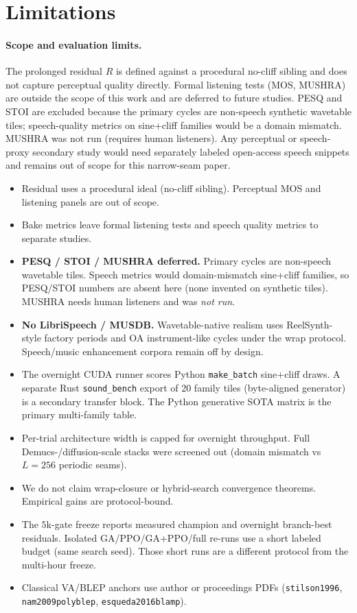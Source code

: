 \section{Limitations}
\label{sec:limitations}

\paragraph{Scope and evaluation limits.}
The prolonged residual $R$ is defined against a procedural no-cliff sibling and does not capture perceptual quality directly.
Formal listening tests (MOS, MUSHRA) are outside the scope of this work and are deferred to future studies.
PESQ and STOI are excluded because the primary cycles are non-speech synthetic wavetable tiles; speech-quality metrics on sine{+}cliff families would be a domain mismatch.
MUSHRA was not run (requires human listeners).
Any perceptual or speech-proxy secondary study would need separately labeled open-access speech snippets and remains out of scope for this narrow-seam paper.

\begin{itemize}
  \item Residual uses a procedural ideal (no-cliff sibling). Perceptual MOS and listening panels are out of scope.
  \item Bake metrics leave formal listening tests and speech quality metrics to separate studies.
  \item \textbf{PESQ / STOI / MUSHRA deferred.} Primary cycles are non-speech wavetable tiles. Speech metrics would domain-mismatch sine{+}cliff families, so PESQ/STOI numbers are absent here (none invented on synthetic tiles). MUSHRA needs human listeners and was \emph{not run}.
  \item \textbf{No LibriSpeech / MUSDB.} Wavetable-native realism uses ReelSynth-style factory periods and OA instrument-like cycles under the wrap protocol. Speech/music enhancement corpora remain off by design.
  \item The overnight CUDA runner scores Python \texttt{make\_batch} sine{+}cliff draws. A separate Rust \texttt{sound\_bench} export of 20 family tiles (byte-aligned generator) is a secondary transfer block. The Python generative SOTA matrix is the primary multi-family table.
  \item Per-trial architecture width is capped for overnight throughput. Full Demucs-/diffusion-scale stacks were screened out (domain mismatch vs $L{=}256$ periodic seams).
  \item We do not claim wrap-closure or hybrid-search convergence theorems. Empirical gains are protocol-bound.
  \item The $5$k-gate freeze reports measured champion and overnight branch-best residuals. Isolated GA/PPO/GA{+}PPO/full re-runs use a short labeled budget (same search seed). Those short runs are a different protocol from the multi-hour freeze.
  \item Classical VA/BLEP anchors use author or proceedings PDFs (\texttt{stilson1996}, \texttt{nam2009polyblep}, \texttt{esqueda2016blamp}).
\end{itemize}

